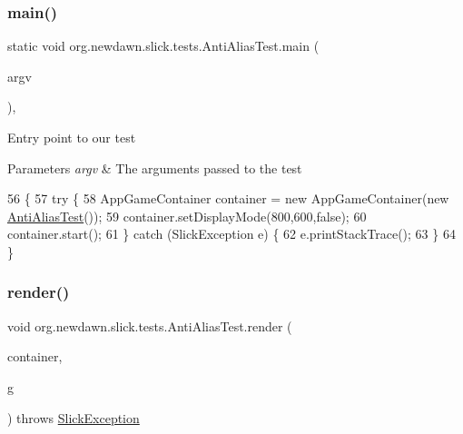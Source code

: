 \subsubsection{\texorpdfstring{main()}{main()}}
{\footnotesize\ttfamily static void org.\+newdawn.\+slick.\+tests.\+Anti\+Alias\+Test.\+main (\begin{DoxyParamCaption}\item[{String \mbox{[}$\,$\mbox{]}}]{argv }\end{DoxyParamCaption})\hspace{0.3cm}{\ttfamily [inline]}, {\ttfamily [static]}}

Entry point to our test


\begin{DoxyParams}{Parameters}
{\em argv} & The arguments passed to the test \\
\hline
\end{DoxyParams}

\begin{DoxyCode}
56                                            \{
57         \textcolor{keywordflow}{try} \{
58             AppGameContainer container = \textcolor{keyword}{new} AppGameContainer(\textcolor{keyword}{new} \mbox{\hyperlink{classorg_1_1newdawn_1_1slick_1_1tests_1_1_anti_alias_test_a78c785d212d06cdc009b83a401545534}{AntiAliasTest}}());
59             container.setDisplayMode(800,600,\textcolor{keyword}{false});
60             container.start();
61         \} \textcolor{keywordflow}{catch} (SlickException e) \{
62             e.printStackTrace();
63         \}
64     \}
\end{DoxyCode}
\mbox{\label{classorg_1_1newdawn_1_1slick_1_1tests_1_1_anti_alias_test_a4700b49db72f7e2c111f0e7bb1af77e9}} 
\subsubsection{\texorpdfstring{render()}{render()}}
{\footnotesize\ttfamily void org.\+newdawn.\+slick.\+tests.\+Anti\+Alias\+Test.\+render (\begin{DoxyParamCaption}\item[{\mbox{\hyperlink{classorg_1_1newdawn_1_1slick_1_1_game_container}{Game\+Container}}}]{container,  }\item[{\mbox{\hyperlink{classorg_1_1newdawn_1_1slick_1_1_graphics}{Graphics}}}]{g }\end{DoxyParamCaption}) throws \mbox{\hyperlink{classorg_1_1newdawn_1_1slick_1_1_slick_exception}{Slick\+Exception}}\hspace{0.3cm}{\ttfamily [inline]}}

